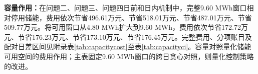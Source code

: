 \textbf{容量作用：}在问题二、问题三、问题四日前和日内机制中，完整9.60 MWh窗口相对停用储能，费用依次节省496.61万元、节省518.01万元、节省487.01万元、节省509.77万元。将可用窗口从4.80 MWh扩大到9.60 MWh，费用依次节省172.72万元、节省176.23万元、节省173.10万元、节省176.45万元。完整费用、分项账目及配对日差区间见附录表\ref{tab:capacitycost}至表\ref{tab:capacityci}。容量对照量化储能可用空间的费用作用；主表固定9.60 MWh窗口的跨日贪心对照，则量化控制策略的改进。
